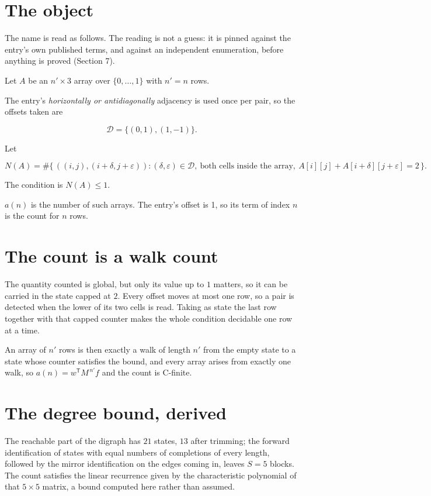 \documentclass[11pt]{article}
\theoremstyle{definition}
\begin{document}
\section{The object}

The name is read as follows. The reading is not a guess: it is pinned against the entry's own published terms, and against an independent enumeration, before anything is proved (Section 7).

Let $A$ be an $n' \times 3$ array over $\{0,\dots,1\}$ with $n' = n$ rows.

The entry's {\itshape horizontally or antidiagonally} adjacency is used once per pair, so the offsets taken are

\[\mathcal{D} = \{(0,1), (1,-1)\}.\]

Let

\[N(A) = \#\bigl\{\,((i,j),(i{+}\delta,j{+}\varepsilon)) : (\delta,\varepsilon) \in \mathcal{D},\ \text{both cells inside the array},\ A[i][j] + A[i{+}\delta][j{+}\varepsilon] = 2\,\bigr\}.\]

The condition is $N(A) \le 1$.

$a(n)$ is the number of such arrays. The entry's offset is 1, so its term of index $n$ is the count for $n$ rows.

\section{The count is a walk count}

The quantity counted is global, but only its value up to $1$ matters, so it can be carried in the state capped at $2$. Every offset moves at most one row, so a pair is detected when the lower of its two cells is read. Taking as state the last row together with that capped counter makes the whole condition decidable one row at a time.

An array of $n'$ rows is then exactly a walk of length $n'$ from the empty state to a state whose counter satisfies the bound, and every array arises from exactly one walk, so $a(n) = w^{\mathsf T}M^{\,n'}f$ and the count is C-finite.

\section{The degree bound, derived}

The reachable part of the digraph has $21$ states, $13$ after trimming; the forward identification of states with equal numbers of completions of every length, followed by the mirror identification on the edges coming in, leaves $S = 5$ blocks. The count satisfies the linear recurrence given by the characteristic polynomial of that $5\times5$ matrix, a bound computed here rather than assumed.
\end{document}
